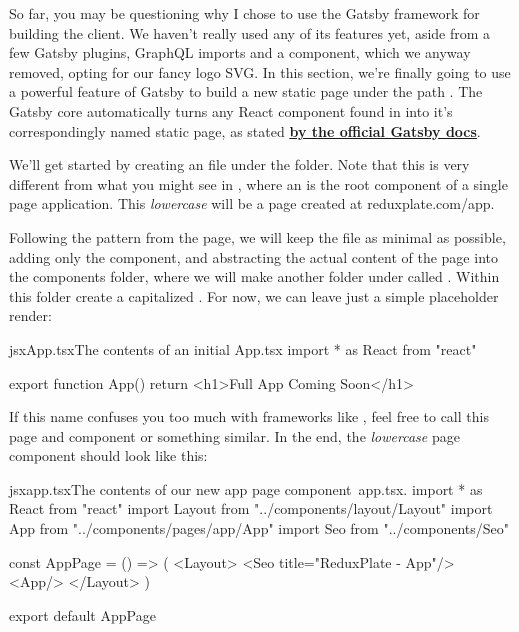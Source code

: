 \documentclass[paper=6in:9in,pagesize=pdftex,headinclude=on,footinclude=on,12pt,twoside]{scrbook}
\newcommand{\link}[2]{\textbf{\textcolor{monokaiPink}{\href{#2}{#1}}}}
\begin{document}

So far, you may be questioning why I chose to use the Gatsby framework for building the client. We haven't really used any of its features yet, aside from a few Gatsby plugins, GraphQL imports and a  component, which we anyway removed, opting for our fancy logo SVG. In this section, we're finally going to use a powerful feature of Gatsby to build a new static page under the path . The Gatsby core automatically turns any React component found in  into it's correspondingly named static page, as stated \link{by the official Gatsby docs}{https://www.gatsbyjs.com/docs/recipes/pages-layouts/}.


We'll get started by creating an  file under the  folder. Note that this is very different from what you might see in , where an  is the root component of a single page application. This \textit{lowercase}  will be a page created at reduxplate.com/app.

Following the pattern from the  page, we will keep the  file as minimal as possible, adding only the  component, and abstracting the actual content of the page into the components folder, where we will make another folder under  called . Within this folder create a capitalized . For now, we can leave just a simple placeholder render:

\begin{codeInput}{jsx}{App.tsx}{The contents of an initial App.tsx}
import * as React from "react"

export function App() {
  return <h1>Full App Coming Soon</h1>
} 
\end{codeInput}

If this name  confuses you too much with frameworks like , feel free to call this page and component  or something similar. In the end, the \textit{lowercase} page component  should look like this:

\begin{codeInput}{jsx}{app.tsx}{The contents of our new app page component\, app.tsx.}
import * as React from "react"
import Layout from "../components/layout/Layout"
import { App } from "../components/pages/app/App"
import Seo from "../components/Seo"

const AppPage = () => (
  <Layout>
    <Seo title="ReduxPlate - App"/>
    <App/>
  </Layout>
)

export default AppPage  
\end{codeInput}
\end{document}
